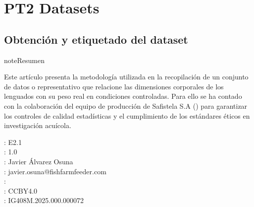 \documentclass[a4paper,10pt,spanish]{jupyterBook}
\begin{document}
\sphinxstepscope


\part{PT2 \sphinxhyphen{} Datasets}

\sphinxstepscope


\chapter{Obtención y etiquetado del dataset}
\label{\detokenize{content/02/Dataset:obtencion-y-etiquetado-del-dataset}}\label{\detokenize{content/02/Dataset::doc}}
\begin{sphinxadmonition}{note}{Resumen}

\sphinxAtStartPar
Este artículo presenta la metodología utilizada en la recopilación de un conjunto de datos o   representativo que relacione las dimensiones corporales de los lenguados con su peso real en condiciones controladas. Para ello se ha contado con la colaboración del equipo de producción de Safistela S.A () para garantizar los controles de calidad estadísticas y el cumplimiento de los estándares éticos en investigación acuícola.

\sphinxAtStartPar
{}: E2.1\\
: 1.0\\
: Javier Álvarez Osuna\\
: javier.osuna@fishfarmfeeder.com\\
: \\
: CC\sphinxhyphen{}BY\sphinxhyphen{}4.0\\
: IG408M.2025.000.000072

\begin{figure}[H]
\centering

\noindent{}
\end{figure}
\end{sphinxadmonition}
\end{document}
